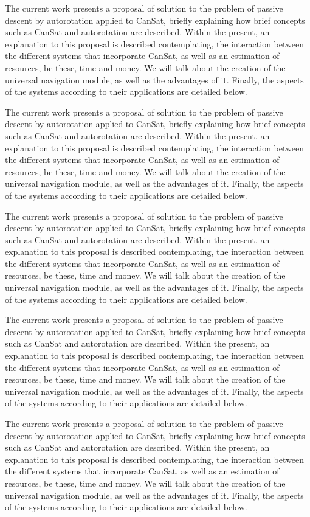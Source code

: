 The current work presents a proposal of solution to the problem of passive descent by autorotation applied to CanSat, briefly explaining how brief concepts such as CanSat and autorotation are described. Within the present, an explanation to this proposal is described contemplating, the interaction between the different systems that incorporate CanSat, as well as an estimation of resources, be these, time and money. We will talk about the creation of the universal navigation module, as well as the advantages of it. Finally, the aspects of the systems according to their applications are detailed below.

The current work presents a proposal of solution to the problem of passive descent by autorotation applied to CanSat, briefly explaining how brief concepts such as CanSat and autorotation are described. Within the present, an explanation to this proposal is described contemplating, the interaction between the different systems that incorporate CanSat, as well as an estimation of resources, be these, time and money. We will talk about the creation of the universal navigation module, as well as the advantages of it. Finally, the aspects of the systems according to their applications are detailed below.

The current work presents a proposal of solution to the problem of passive descent by autorotation applied to CanSat, briefly explaining how brief concepts such as CanSat and autorotation are described. Within the present, an explanation to this proposal is described contemplating, the interaction between the different systems that incorporate CanSat, as well as an estimation of resources, be these, time and money. We will talk about the creation of the universal navigation module, as well as the advantages of it. Finally, the aspects of the systems according to their applications are detailed below.

The current work presents a proposal of solution to the problem of passive descent by autorotation applied to CanSat, briefly explaining how brief concepts such as CanSat and autorotation are described. Within the present, an explanation to this proposal is described contemplating, the interaction between the different systems that incorporate CanSat, as well as an estimation of resources, be these, time and money. We will talk about the creation of the universal navigation module, as well as the advantages of it. Finally, the aspects of the systems according to their applications are detailed below.

The current work presents a proposal of solution to the problem of passive descent by autorotation applied to CanSat, briefly explaining how brief concepts such as CanSat and autorotation are described. Within the present, an explanation to this proposal is described contemplating, the interaction between the different systems that incorporate CanSat, as well as an estimation of resources, be these, time and money. We will talk about the creation of the universal navigation module, as well as the advantages of it. Finally, the aspects of the systems according to their applications are detailed below.

